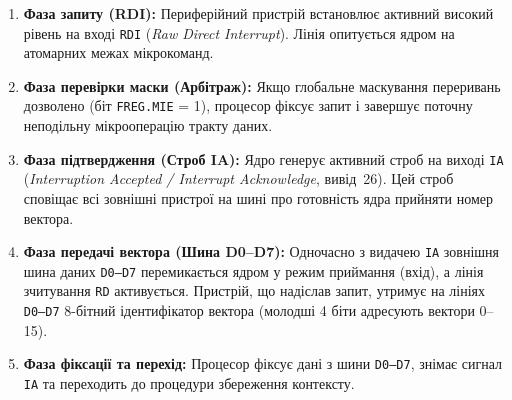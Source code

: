 \documentclass[11pt,a4paper]{article}
\newcommand{\reg}[1]{\texttt{#1}}
\begin{document}
\begin{enumerate}
  \item \textbf{Фаза запиту (RDI):} Периферійний пристрій встановлює активний високий рівень на вході \texttt{RDI} (\textit{Raw Direct Interrupt}). Лінія опитується ядром на атомарних межах мікрокоманд.
  \item \textbf{Фаза перевірки маски (Арбітраж):} Якщо глобальне маскування переривань дозволено (біт \reg{FREG.MIE} = 1), процесор фіксує запит і завершує поточну неподільну мікрооперацію тракту даних.
  \item \textbf{Фаза підтвердження (Строб IA):} Ядро генерує активний строб на виході \texttt{IA} (\textit{Interruption Accepted / Interrupt Acknowledge}, вивід~26). Цей строб сповіщає всі зовнішні пристрої на шині про готовність ядра прийняти номер вектора.
  \item \textbf{Фаза передачі вектора (Шина D0--D7):} Одночасно з видачею \texttt{IA} зовнішня шина даних \texttt{D0--D7} перемикається ядром у режим приймання (вхід), а лінія зчитування \texttt{RD} активується. Пристрій, що надіслав запит, утримує на лініях \texttt{D0--D7} 8-бітний ідентифікатор вектора (молодші 4 біти адресують вектори 0--15).
  \item \textbf{Фаза фіксації та перехід:} Процесор фіксує дані з шини \texttt{D0--D7}, знімає сигнал \texttt{IA} та переходить до процедури збереження контексту.
\end{enumerate}
\end{document}
